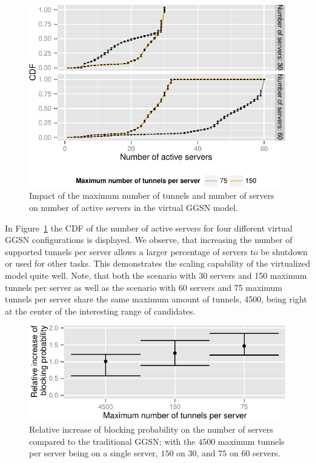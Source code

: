 \begin{figure}[htb]
  \centering
  \includegraphics{images/instanceuse-multiserver-real.pdf}
  \caption{Impact of the maximum number of tunnels and number of servers on number of active servers in the virtual \gls{GGSN} model.}
 \label{c4:fig:instance_use_virtual}
\end{figure}

In Figure~\ref{c4:fig:instance_use_virtual} the \gls{CDF} of the number of active servers for four different virtual \gls{GGSN} configurations is displayed. We observe, that increasing the number of supported tunnels per server allows a larger percentage of servers to be shutdown or used for other tasks. This demonstrates the scaling capability of the virtualized model quite well. Note, that both the scenario with 30 servers and 150 maximum tunnels per server as well as the scenario with 60 servers and 75 maximum tunnels per server share the same maximum amount of tunnels, 4500, being right at the center of the interesting range of candidates.


\begin{figure}[htb]
  \centering
  \includegraphics{images/blocking-comparison.pdf}
  \caption{Relative increase of blocking probability on the number of servers compared to the traditional \gls{GGSN}; with the $4500$ maximum tunnels per server being on a single server, $150$ on $30$, and $75$ on $60$ servers.}
 \label{c4:fig:blocking-comparison}
\end{figure}


